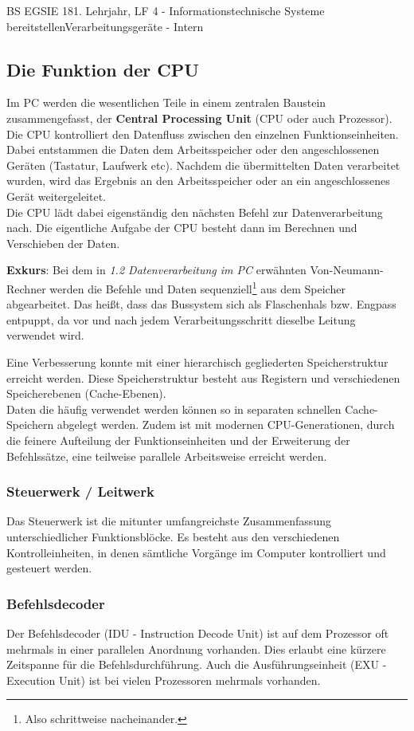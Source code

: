 \documentclass[oneside,openany,headings=optiontotoc,11pt,numbers=noenddot]{article}
\begin{document}
\begin{worksheet}{BS EGSIE 18}{1. Lehrjahr, LF 4 - Informationstechnische Systeme bereitstellen}{Verarbeitungsgeräte - Intern}
		\subsection{Die Funktion der CPU}
		Im PC werden die wesentlichen Teile in einem zentralen Baustein zusammengefasst, der \textbf{Central Processing Unit} (CPU oder auch Prozessor).\\
		Die CPU kontrolliert den Datenfluss zwischen den einzelnen Funktionseinheiten. Dabei entstammen die Daten dem Arbeitsspeicher oder den angeschlossenen Geräten (Tastatur, Laufwerk etc). Nachdem die übermittelten Daten verarbeitet wurden, wird das Ergebnis an den Arbeitsspeicher oder an ein angeschlossenes Gerät weitergeleitet.\\
		Die CPU lädt dabei eigenständig den nächsten Befehl zur Datenverarbeitung nach. Die eigentliche Aufgabe der CPU besteht dann im Berechnen und Verschieben der Daten.
		\begin{framed}
			\noindent\footnotesize
			\textbf{Exkurs}: Bei dem in \textit{1.2 Datenverarbeitung im PC} erwähnten Von-Neumann-Rechner werden die Befehle und Daten sequenziell\footnote{Also schrittweise nacheinander.} aus dem Speicher abgearbeitet. Das heißt, dass das Bussystem sich als Flaschenhals bzw. Engpass entpuppt, da vor und nach jedem Verarbeitungsschritt dieselbe Leitung verwendet wird.\\
			\par\noindent
			Eine Verbesserung konnte mit einer hierarchisch gegliederten Speicherstruktur erreicht werden. Diese Speicherstruktur besteht aus Registern und verschiedenen Speicherebenen (Cache-Ebenen).\\
			Daten die häufig verwendet werden können so in separaten schnellen Cache-Speichern abgelegt werden. Zudem ist mit modernen CPU-Generationen, durch die feinere Aufteilung der Funktionseinheiten und der Erweiterung der Befehlssätze, eine teilweise parallele Arbeitsweise erreicht werden.
		\end{framed}
		\normalsize
		\subsubsection*{Steuerwerk / Leitwerk}
		Das Steuerwerk ist die mitunter umfangreichste Zusammenfassung unterschiedlicher Funktionsblöcke. Es besteht aus den verschiedenen Kontrolleinheiten, in denen sämtliche Vorgänge im Computer kontrolliert und gesteuert werden.
		\subsubsection*{Befehlsdecoder}
		Der Befehlsdecoder (IDU - Instruction Decode Unit) ist auf dem Prozessor oft mehrmals in einer parallelen Anordnung vorhanden. Dies erlaubt eine kürzere Zeitspanne für die Befehlsdurchführung. Auch die Ausführungseinheit (EXU - Execution Unit) ist bei vielen Prozessoren mehrmals vorhanden.

\end{worksheet}
\end{document}
